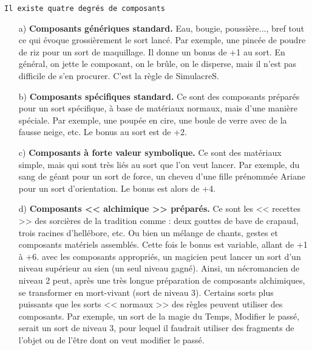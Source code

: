 \documentclass[11pt,twoside,a4paper]{article}
\begin{document}
\begin{multicols*}{3}
{\texttt{Il existe quatre degr{\'e}s de composants}

\begin{itemize}
	\item[a)] \textbf{Composants g{\'e}n{\'e}riques standard. }Eau, bougie, poussi{\`e}re..., bref tout ce qui {\'e}voque grossi{\`e}rement le sort lanc{\'e}. Par exemple, une pinc{\'e}e de poudre de riz pour un sort de maquillage. Il donne un bonus de +1 au sort. En g{\'e}n{\'e}ral, on jette le composant, on le br{\^u}le, on le disperse, mais il n'est pas difficile de s'en procurer. C'est la r{\`e}gle de SimulacreS.
	\item[b)] \textbf{Composants sp{\'e}cifiques standard. }Ce sont des composants pr{\'e}par{\'e}s pour un sort sp{\'e}cifique, {\`a} base de mat{\'e}riaux normaux, mais d'une mani{\`e}re sp{\'e}ciale. Par exemple, une poup{\'e}e en cire, une boule de verre avec de la fausse neige, etc. Le bonus au sort est de +2.
	\item[c)] \textbf{Composants {\`a} forte valeur symbolique. }Ce sont des mat{\'e}riaux simple, mais qui sont tr{\`e}s li{\'e}s au sort que l'on veut lancer. Par exemple, du sang de g{\'e}ant pour un sort de force, un cheveu d'une fille pr{\'e}nomm{\'e}e Ariane pour un sort d'orientation. Le bonus est alors de +4.
	\item[d)] \textbf{Composants << alchimique >> pr{\'e}par{\'e}s. }Ce sont les << recettes >> des sorci{\`e}res de la tradition comme : deux gouttes de bave de crapaud, trois racines d'hell{\'e}bore, etc. Ou bien un m{\'e}lange de chants, gestes et composants mat{\'e}riels assembl{\'e}s. Cette fois le bonus est variable, allant de +1 {\`a} +6. avec les composants appropri{\'e}s, un magicien peut lancer un sort d'un niveau sup{\'e}rieur au sien (un seul niveau gagn{\'e}). Ainsi, un n{\'e}cromancien de niveau 2 peut, apr{\`e}s une tr{\`e}s longue pr{\'e}paration de composants alchimiques, se transformer en mort-vivant (sort de niveau 3). Certains sorts plus puissants que les sorts << normaux >> des r{\`e}gles peuvent utiliser des composants. Par exemple, un sort de la magie du Temps, Modifier le pass{\'e}, serait un sort de niveau 3, pour lequel il faudrait utiliser des fragments de l'objet ou de l'{\^e}tre dont on veut modifier le pass{\'e}.
\end{itemize}~\\

}
\end{multicols*}
\end{document}
